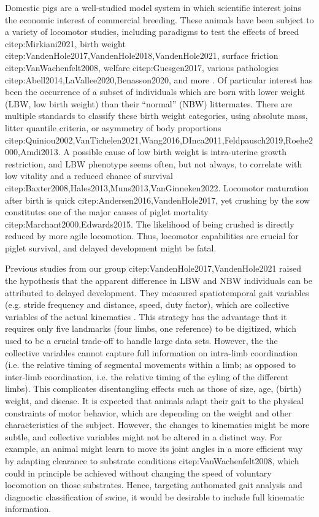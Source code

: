 Domestic pigs are a well-studied model system in which scientific interest joins the economic interest of commercial breeding.
These animals have been subject to a variety of locomotor studies, including paradigms to test the effects of breed citep:Mirkiani2021, birth weight citep:VandenHole2017,VandenHole2018,VandenHole2021, surface friction citep:VanWachenfelt2008, welfare citep:Guesgen2017, various pathologies citep:Abell2014,LaVallee2020,Benasson2020, and more \citep[\textit{cf.}][]{Netukova2021}.
Of particular interest has been the occurrence of a subset of individuals which are born with lower weight (LBW, low birth weight) than their ``normal'' (NBW) littermates.
There are multiple standards to classify these birth weight categories, using absolute mass, litter quantile criteria, or asymmetry of body proportions citep:Quiniou2002,VanTichelen2021,Wang2016,DInca2011,Feldpausch2019,Roehe2000,Amdi2013.
A possible cause of low birth weight is intra-uterine growth restriction, and LBW phenotype seems often, but not always, to correlate with low vitality and a reduced chance of survival citep:Baxter2008,Hales2013,Muns2013,VanGinneken2022.
Locomotor maturation after birth is quick citep:Andersen2016,VandenHole2017, yet crushing by the sow constitutes one of the major causes of piglet mortality citep:Marchant2000,Edwards2015.
The likelihood of being crushed is directly reduced by more agile locomotion.
Thus, locomotor capabilities are crucial for piglet survival, and delayed development might be fatal.

Previous studies from our group citep:VandenHole2017,VandenHole2021 raised the hypothesis that the apparent difference in LBW and NBW individuals can be attributed to delayed development.
They measured spatiotemporal gait variables (e.g. stride frequency and distance, speed, duty factor), which are collective variables of the actual kinematics \citep[\textit{cf.}][]{Newell2021,Nishikawa2007,Aerts2000}.
This strategy has the advantage that it requires only five landmarks (four limbs, one reference) to be digitized, which used to be a crucial trade-off to handle large data sets.
However, the the collective variables cannot capture full information on intra-limb coordination (i.e. the relative timing of segmental movements within a limb; as opposed to inter-limb coordination, i.e. the relative timing of the cyling of the different limbs).
This complicates disentangling effects such as those of size, age, (birth) weight, and disease.
It is expected that animals adapt their gait to the physical constraints of motor behavior, which are depending on the weight and other characteristics of the subject.
However, the changes to kinematics might be more subtle, and collective variables might not be altered in a distinct way.
For example, an animal might learn to move its joint angles in a more efficient way by adapting clearance to substrate conditions citep:VanWachenfelt2008, which could in principle be achieved without changing the speed of voluntary locomotion on those substrates.
Hence, targeting authomated gait analysis and diagnostic classification of swine, it would be desirable to include full kinematic information.


